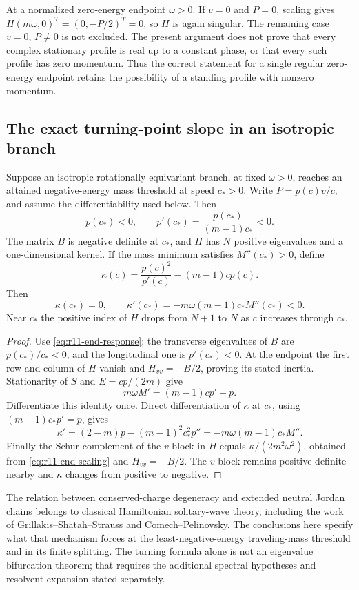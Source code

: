 \begin{remark}
At a normalized zero-energy endpoint $\omega>0$.  If $v=0$ and $P=0$,
scaling gives $H(m\omega,0)^T=(0,-P/2)^T=0$, so $H$ is again singular.
The remaining case $v=0$, $P\ne0$ is not excluded.  The present argument
does not prove that every complex stationary profile is real up to a
constant phase, or that every such profile has zero momentum.  Thus the
correct statement for a single regular zero-energy endpoint retains the
possibility of a standing profile with nonzero momentum.
\end{remark}

\subsection{The exact turning-point slope in an isotropic branch}

\begin{proposition}\label{prop:r11-end-turning}
Suppose an isotropic rotationally equivariant branch, at fixed
$\omega>0$, reaches an attained negative-energy mass threshold at speed
$c_*>0$.  Write $P=p(c)v/c$, and assume the differentiability used below.
Then
\[
 p(c_*)<0,\qquad
 p'(c_*)=\frac{p(c_*)}{(m-1)c_*}<0.
\]
The matrix $B$ is negative definite at $c_*$, and $H$ has $N$ positive
eigenvalues and a one-dimensional kernel.  If the mass minimum satisfies
$M''(c_*)>0$, define
\[
 \kappa(c)=\frac{p(c)^2}{p'(c)}-(m-1)cp(c).
\]
Then
\begin{equation}\label{eq:r11-end-kappaprime}
 \kappa(c_*)=0,\qquad
 \kappa'(c_*)=-m\omega(m-1)c_*M''(c_*)<0.
\end{equation}
Near $c_*$ the positive index of $H$ drops from $N+1$ to $N$ as $c$
increases through $c_*$.
\end{proposition}
\begin{proof}
Use \eqref{eq:r11-end-response}; the transverse eigenvalues of $B$
are $p(c_*)/c_*<0$, and the longitudinal one is $p'(c_*)<0$.
At the endpoint the first row and column of $H$ vanish and
$H_{vv}=-B/2$, proving its stated inertia.
Stationarity of $S$ and $E=cp/(2m)$ give
\[
 m\omega M'=(m-1)cp'-p.
\]
Differentiate this identity once.  Direct differentiation of $\kappa$
at $c_*$, using $(m-1)c_*p'=p$, gives
\[
 \kappa'=(2-m)p-(m-1)^2c_*^2p''
          =-m\omega(m-1)c_*M''.
\]
Finally the Schur complement of the $v$ block in $H$ equals
$\kappa/(2m^2\omega^2)$, obtained from
\eqref{eq:r11-end-scaling} and $H_{vv}=-B/2$.  The $v$ block remains
positive definite nearby and $\kappa$ changes from positive to negative.
\end{proof}

The relation between conserved-charge degeneracy and extended neutral
Jordan chains belongs to classical Hamiltonian solitary-wave theory,
including the work of Grillakis--Shatah--Strauss and
Comech--Pelinovsky.  The conclusions here specify what that mechanism
forces at the least-negative-energy traveling-mass threshold and in its
finite splitting.  The turning formula alone is not an eigenvalue
bifurcation theorem; that requires the additional spectral hypotheses
and resolvent expansion stated separately.
